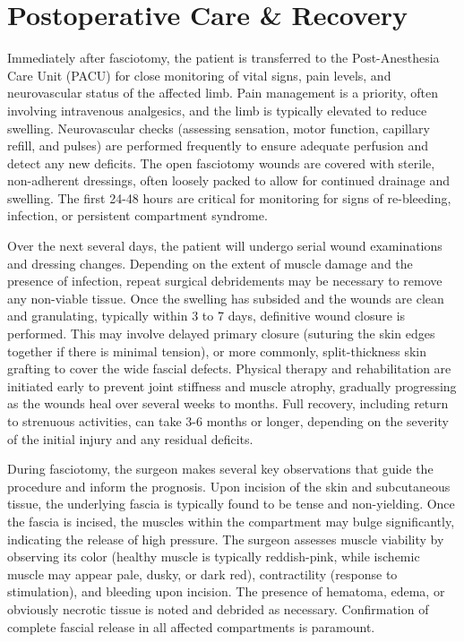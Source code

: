 \section*{Postoperative Care \& Recovery}
Immediately after fasciotomy, the patient is transferred to the Post-Anesthesia Care Unit (PACU) for close monitoring of vital signs, pain levels, and neurovascular status of the affected limb. Pain management is a priority, often involving intravenous analgesics, and the limb is typically elevated to reduce swelling. Neurovascular checks (assessing sensation, motor function, capillary refill, and pulses) are performed frequently to ensure adequate perfusion and detect any new deficits. The open fasciotomy wounds are covered with sterile, non-adherent dressings, often loosely packed to allow for continued drainage and swelling. The first 24-48 hours are critical for monitoring for signs of re-bleeding, infection, or persistent compartment syndrome.

Over the next several days, the patient will undergo serial wound examinations and dressing changes. Depending on the extent of muscle damage and the presence of infection, repeat surgical debridements may be necessary to remove any non-viable tissue. Once the swelling has subsided and the wounds are clean and granulating, typically within 3 to 7 days, definitive wound closure is performed. This may involve delayed primary closure (suturing the skin edges together if there is minimal tension), or more commonly, split-thickness skin grafting to cover the wide fascial defects. Physical therapy and rehabilitation are initiated early to prevent joint stiffness and muscle atrophy, gradually progressing as the wounds heal over several weeks to months. Full recovery, including return to strenuous activities, can take 3-6 months or longer, depending on the severity of the initial injury and any residual deficits.

During fasciotomy, the surgeon makes several key observations that guide the procedure and inform the prognosis. Upon incision of the skin and subcutaneous tissue, the underlying fascia is typically found to be tense and non-yielding. Once the fascia is incised, the muscles within the compartment may bulge significantly, indicating the release of high pressure. The surgeon assesses muscle viability by observing its color (healthy muscle is typically reddish-pink, while ischemic muscle may appear pale, dusky, or dark red), contractility (response to stimulation), and bleeding upon incision. The presence of hematoma, edema, or obviously necrotic tissue is noted and debrided as necessary. Confirmation of complete fascial release in all affected compartments is paramount.

